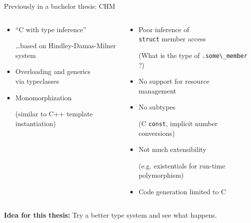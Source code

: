 \documentclass[aspectratio=169]{beamer}
\newcommand{\li}[1]{\lstinline{#1}}
\def\smll{\scriptsize}
\begin{document}
\begin{frame}{Previously in a bachelor thesis: CHM}
\begin{columns}
\begin{column}{.5\linewidth}
  \begin{itemize}\small
  \item[\color{blue!66}\faArrowRight] ``C with type inference'' \\{\smll\dots based on \alert<3>{Hindley-Damas-Milner system}\par}
  \item[\color{blue!66}\faArrowRight] Overloading and generics \\ via typeclasses
  \item[\color{blue!66}\faArrowRight] Monomorphization \\{\smll(similar to C++ template instantiation)\par}
  \end{itemize}
\end{column}\pause
\begin{column}{.5\linewidth}
  \begin{itemize}\small
  \item[\color{red}\faTimes] Poor inference of \\ \texttt{struct} member access \\ {\smll(What is the type of \li{.some\_member} ?)\par}
  \item[\color{red}\faTimes] No support for resource management
  \item[\color{red}\faTimes] No subtypes \\{\smll (C \li{const}, implicit number conversions)\par}
  \item[\color{red}\faTimes] Not much extensibility \\{\smll(e.g. existentials for run-time polymorphism)\par}
  \item[\color{red}\faTimes] Code generation limited to C 
  \end{itemize}
\end{column}
\end{columns}

\vspace{3ex}
\pause\textbf{Idea for this thesis:} Try a \alert{better type system} and see what happens.
\end{frame}

\end{document}
